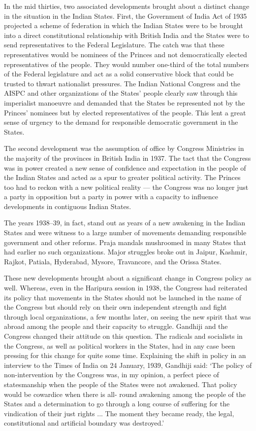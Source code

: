 \begin{multicols}{2}
In the mid thirties, two associated developments brought about a distinct change in the situation in the Indian States. First, the Government of India Act of 1935 projected a scheme of federation in which the Indian States were to be brought into a direct constitutional relationship with British India and the States were to send representatives to the Federal Legislature. The catch was that these representatives would be nominees of the Princes and not democratically elected representatives of the people. They would number one-third of the total numbers of the Federal legislature and act as a solid conservative block that could be trusted to thwart nationalist pressures. The Indian National Congress and the AISPC and other organizations of the States' people clearly saw through this imperialist manoeuvre and demanded that the States be represented not by the Princes' nominees but by elected representatives of the people. This lent a great sense of urgency to the demand for responsible democratic government in the States. 

The second development was the assumption of office by Congress Ministries in the majority of the provinces in British India in 1937. The tact that the Congress was in power created a new sense of confidence and expectation in the people of the Indian States and acted as a spur to greater political activity. The Princes too had to reckon with a new political reality --- the Congress was no longer just a party in opposition but a party in power with a capacity to influence developments in contiguous Indian States. 

The years 1938--39, in fact, stand out as years of a new awakening in the Indian States and were witness to a large number of movements demanding responsible government and other reforms. Praja mandals mushroomed in many States that had earlier no such organizations. Major struggles broke out in Jaipur, Kashmir, Rajkot, Patiala, Hyderabad, Mysore, Travancore, and the Orissa States. 

These new developments brought about a significant change in Congress policy as well. Whereas, even in the Haripura session in 1938, the Congress had reiterated its policy that movements in the States should not be launched in the name of the Congress but should rely on their own independent strength and fight through local organizations, a few months later, on seeing the new spirit that was abroad among the people and their capacity to struggle. Gandhiji and the Congress changed their attitude on this question. The radicals and socialists in the Congress, as well as political workers in the States, had in any case been pressing for this change for quite some time. Explaining the shift in policy in an interview to the Times of India on 24 January, 1939, Gandhiji said: `The policy of non-intervention by the Congress was, in my opinion, a perfect piece of statesmanship when the people of the States were not awakened. That policy would be cowardice when there is all- round awakening among the people of the States and a determination to go through a long course of suffering for the vindication of their just rights ... The moment they became ready, the legal, constitutional and artificial boundary was destroyed.' 


\end{multicols}
